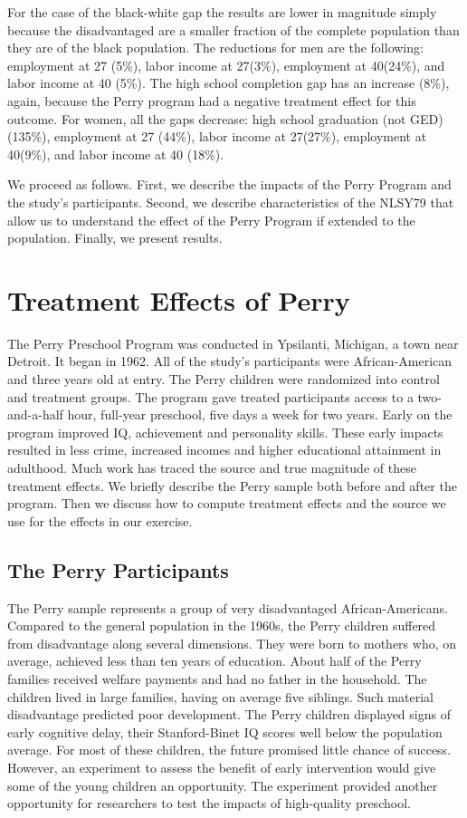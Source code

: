 For the case of the black-white gap the results are lower in magnitude simply because the disadvantaged are a smaller fraction of the complete population than they are of the black population. The reductions for men are the following: employment at 27 (5\%), labor income at 27(3\%), employment at 40(24\%), and labor income at 40 (5\%). The high school completion gap has an increase (8\%), again, because the Perry program had a negative treatment effect for this outcome. For women, all the gaps decrease: high school graduation (not GED) (135\%), employment at 27 (44\%), labor income at 27(27\%), employment at 40(9\%), and labor income at 40 (18\%).

 

We proceed as follows. First, we describe the impacts of the Perry Program and the study's participants. Second, we describe characteristics of the NLSY79 that allow us to understand the effect of the Perry Program if extended to the population. Finally, we present results.

\section{Treatment Effects of Perry}
The Perry Preschool Program was conducted in Ypsilanti, Michigan, a town near Detroit. It began in 1962. All of the study's participants were African-American and three years old at entry. The Perry children were randomized into control and treatment groups. The program gave treated participants access to a two-and-a-half hour, full-year preschool, five days a week for two years. Early on the program improved IQ, achievement and personality skills. These early impacts resulted in less crime, increased incomes and higher educational attainment in adulthood. Much work has traced the source and true magnitude of these treatment effects. We briefly describe the Perry sample both before and after the program. Then we discuss how to compute treatment effects and the source we use for the effects in our exercise. 

\subsection{The Perry Participants}
The Perry sample represents a group of very disadvantaged African-Americans. Compared to the general population in the 1960s, the Perry children suffered from disadvantage along several dimensions. They were born to mothers who, on average, achieved less than ten years of education. About half of the Perry families received welfare payments and had no father in the household. The children lived in large families, having on average five siblings. Such material disadvantage predicted poor development. The Perry children displayed signs of early cognitive delay, their Stanford-Binet IQ scores well below the population average. For most of these children, the future promised little chance of success. However, an experiment to assess the benefit of early intervention would give some of the young children an opportunity. The experiment provided another opportunity for researchers to test the impacts of high-quality preschool. 

